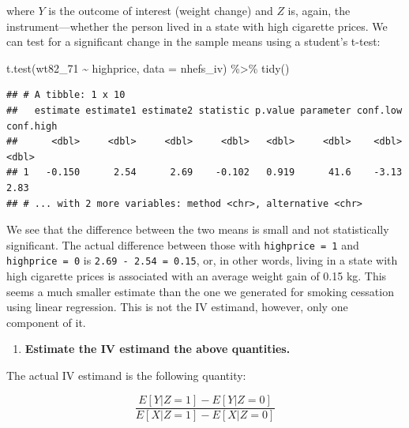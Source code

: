 \documentclass[
]{book}
\newenvironment{Shaded}{\begin{snugshade}}{\end{snugshade}}
\newcommand{\AttributeTok}[1]{\textcolor[rgb]{0.77,0.63,0.00}{#1}}
\newcommand{\FunctionTok}[1]{\textcolor[rgb]{0.00,0.00,0.00}{#1}}
\newcommand{\NormalTok}[1]{#1}
\newcommand{\SpecialCharTok}[1]{\textcolor[rgb]{0.00,0.00,0.00}{#1}}
\providecommand{\tightlist}{%
  \setlength{\itemsep}{0pt}\setlength{\parskip}{0pt}}
\begin{document}
where \(Y\) is the outcome of interest (weight change) and \(Z\) is, again, the instrument---whether the person lived in a state with high cigarette prices. We can test for a significant change in the sample means using a student's t-test:

\begin{Shaded}
\begin{Highlighting}[]
\FunctionTok{t.test}\NormalTok{(wt82\_71 }\SpecialCharTok{\textasciitilde{}}\NormalTok{ highprice, }\AttributeTok{data =}\NormalTok{ nhefs\_iv) }\SpecialCharTok{\%\textgreater{}\%} 
  \FunctionTok{tidy}\NormalTok{()}
\end{Highlighting}
\end{Shaded}

\begin{verbatim}
## # A tibble: 1 x 10
##   estimate estimate1 estimate2 statistic p.value parameter conf.low conf.high
##      <dbl>     <dbl>     <dbl>     <dbl>   <dbl>     <dbl>    <dbl>     <dbl>
## 1   -0.150      2.54      2.69    -0.102   0.919      41.6    -3.13      2.83
## # ... with 2 more variables: method <chr>, alternative <chr>
\end{verbatim}

We see that the difference between the two means is small and not statistically significant. The actual difference between those with \texttt{highprice\ =\ 1} and \texttt{highprice\ =\ 0} is \texttt{2.69\ -\ 2.54\ =\ 0.15}, or, in other words, living in a state with high cigarette prices is associated with an average weight gain of 0.15 kg. This seems a much smaller estimate than the one we generated for smoking cessation using linear regression. This is not the IV estimand, however, only one component of it.

\begin{enumerate}
\def\labelenumi{\arabic{enumi}.}
\setcounter{enumi}{2}
\tightlist
\item
  \textbf{Estimate the IV estimand the above quantities.}
\end{enumerate}

The actual IV estimand is the following quantity:

\[
\frac{E[Y|Z=1] - E[Y|Z=0]}{E[X|Z=1] - E[X|Z=0]}
\]
\end{document}
